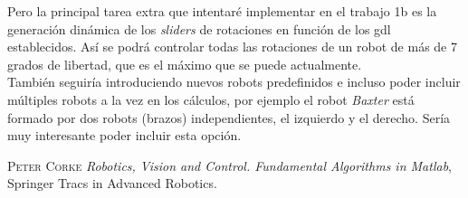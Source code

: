 \documentclass[a4paper, fontsize=11pt]{scrartcl} %
\numberwithin{equation}{section} %
\numberwithin{figure}{section} %
\numberwithin{table}{section} %
\begin{document}
	Pero la principal tarea extra que intentaré implementar en el trabajo 1b es la generación dinámica de los \textit{sliders} de rotaciones en función de los gdl establecidos. Así se podrá controlar todas las rotaciones de un robot de más de 7 grados de libertad, que es el máximo que se puede actualmente.\\

	También seguiría introduciendo nuevos robots predefinidos e incluso poder incluir múltiples robots a la vez en los cálculos, por ejemplo el robot \textit{Baxter} está formado por dos robots (brazos) independientes, el izquierdo y el derecho. Sería muy interesante poder incluir esta opción.\\
	
	 
	
	\begin{thebibliography}{X}
		
		 \textsc{Peter Corke} \textit{Robotics, Vision and Control. Fundamental Algorithms in Matlab}, Springer Tracs in Advanced Robotics.
		
		
	\end{thebibliography}
	
\end{document}
